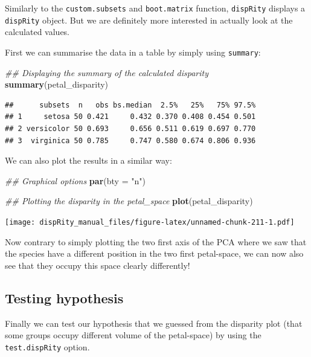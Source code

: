 \documentclass[
]{book}
\newenvironment{Shaded}{\begin{snugshade}}{\end{snugshade}}
\newcommand{\CommentTok}[1]{\textcolor[rgb]{0.56,0.35,0.01}{\textit{#1}}}
\newcommand{\DataTypeTok}[1]{\textcolor[rgb]{0.13,0.29,0.53}{#1}}
\newcommand{\KeywordTok}[1]{\textcolor[rgb]{0.13,0.29,0.53}{\textbf{#1}}}
\newcommand{\NormalTok}[1]{#1}
\newcommand{\StringTok}[1]{\textcolor[rgb]{0.31,0.60,0.02}{#1}}
\begin{document}
Similarly to the \texttt{custom.subsets} and \texttt{boot.matrix} function, \texttt{dispRity} displays a \texttt{dispRity} object.
But we are definitely more interested in actually look at the calculated values.

First we can summarise the data in a table by simply using \texttt{summary}:

\begin{Shaded}
\begin{Highlighting}[]
\CommentTok{\#\# Displaying the summary of the calculated disparity}
\KeywordTok{summary}\NormalTok{(petal\_disparity)}
\end{Highlighting}
\end{Shaded}

\begin{verbatim}
##      subsets  n   obs bs.median  2.5%   25%   75% 97.5%
## 1     setosa 50 0.421     0.432 0.370 0.408 0.454 0.501
## 2 versicolor 50 0.693     0.656 0.511 0.619 0.697 0.770
## 3  virginica 50 0.785     0.747 0.580 0.674 0.806 0.936
\end{verbatim}

We can also plot the results in a similar way:

\begin{Shaded}
\begin{Highlighting}[]
\CommentTok{\#\# Graphical options}
\KeywordTok{par}\NormalTok{(}\DataTypeTok{bty =} \StringTok{"n"}\NormalTok{)}

\CommentTok{\#\# Plotting the disparity in the petal\_space}
\KeywordTok{plot}\NormalTok{(petal\_disparity)}
\end{Highlighting}
\end{Shaded}

\texttt{[image: dispRity\_manual\_files/figure-latex/unnamed-chunk-211-1.pdf]}

Now contrary to simply plotting the two first axis of the PCA where we saw that the species have a different position in the two first petal-space, we can now also see that they occupy this space clearly differently!

\hypertarget{testing-hypothesis}{%
\subsection{Testing hypothesis}\label{testing-hypothesis}}

Finally we can test our hypothesis that we guessed from the disparity plot (that some groups occupy different volume of the petal-space) by using the \texttt{test.dispRity} option.
\end{document}
